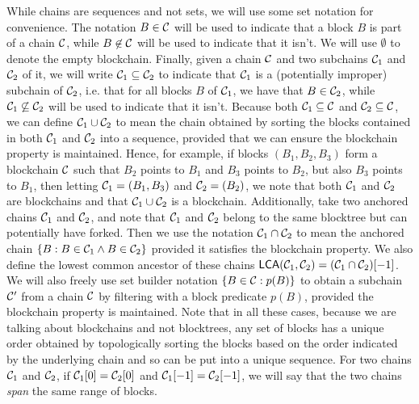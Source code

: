 While chains are sequences and not sets, we will use some set notation for
convenience. The notation $B \in \mathcal{C}$ will be used to indicate that a block
$B$ is part of a chain $\mathcal{C}$, while $B \not\in \mathcal{C}$ will be used to
indicate that it isn't. We will use $\emptyset$ to denote the empty blockchain.
Finally, given a chain $\mathcal{C}$ and two subchains $\mathcal{C}_1$ and $\mathcal{C}_2$ of
it, we will write $\mathcal{C}_1 \subseteq \mathcal{C}_2$ to indicate that $\mathcal{C}_1$ is a
(potentially improper) subchain of $\mathcal{C}_2$, i.e. that for all blocks $B$ of
$\mathcal{C}_1$, we have that $B \in \mathcal{C}_2$, while $\mathcal{C}_1 \not\subseteq
\mathcal{C}_2$ will be used to indicate that it isn't. Because both $\mathcal{C}_1
\subseteq \mathcal{C}$ and $\mathcal{C}_2 \subseteq \mathcal{C}$, we can define $\mathcal{C}_1 \cup
\mathcal{C}_2$ to mean the chain obtained by sorting the blocks contained in both
$\mathcal{C}_1$ and $\mathcal{C}_2$ into a sequence, provided that we can ensure the
blockchain property is maintained. Hence, for example, if blocks $(B_1, B_2,
B_3)$ form a blockchain $\mathcal{C}$ such that $B_2$ points to $B_1$ and $B_3$
points to $B_2$, but also $B_3$ points to $B_1$, then letting $\mathcal{C}_1 = (B_1,
B_3)$ and $\mathcal{C}_2 = (B_2)$, we note that both $\mathcal{C}_1$ and $\mathcal{C}_2$ are
blockchains and that $\mathcal{C}_1 \cup \mathcal{C}_2$ is a blockchain. Additionally,
take two anchored chains $\mathcal{C}_1$ and $\mathcal{C}_2$, and note that $\mathcal{C}_1$ and
$\mathcal{C}_2$ belong to the same blocktree but can potentially have forked. Then we
use the notation $\mathcal{C}_1 \cap \mathcal{C}_2$ to mean the anchored chain $\{B: B \in
\mathcal{C}_1 \land B \in \mathcal{C}_2\}$ provided it satisfies the blockchain property.
We also define the lowest common ancestor of these chains $\textsf{LCA}(\mathcal{C}_1,
\mathcal{C}_2) = (\mathcal{C}_1 \cap \mathcal{C}_2)[-1]$. We will also freely use set builder
notation $\{B \in \mathcal{C}: p(B)\}$ to obtain a subchain $\mathcal{C}'$ from a chain
$\mathcal{C}$ by filtering with a block predicate $p(B)$, provided the blockchain
property is maintained. Note that in all these cases, because we are talking
about blockchains and not blocktrees, any set of blocks has a unique order
obtained by topologically sorting the blocks based on the order indicated by the
underlying chain and so can be put into a unique sequence. For two chains
$\mathcal{C}_1$ and $\mathcal{C}_2$, if $\mathcal{C}_1[0] = \mathcal{C}_2[0]$ and $\mathcal{C}_1[-1] =
\mathcal{C}_2[-1]$, we will say that the two chains \textit{span} the same range of
blocks.


